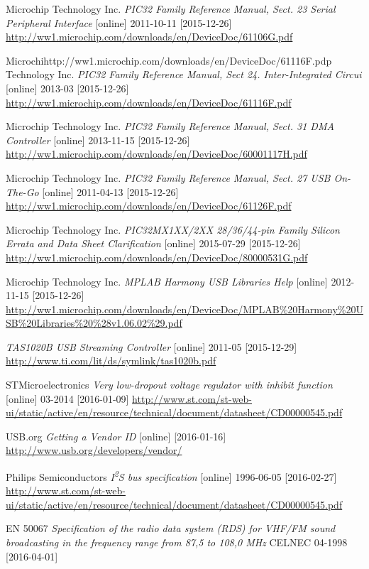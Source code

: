 \documentclass[czech,master,public,dept460,male,cpdeclaration]{diploma}	%
\newcommand{\iis}{I\textsuperscript{2}S }
\begin{document}
\begin{thebibliography}{99}
 Microchip Technology Inc.
\textit{PIC32 Family Reference Manual, Sect. 23 Serial Peripheral Interface} [online] 2011-10-11 [2015-12-26]
\url{http://ww1.microchip.com/downloads/en/DeviceDoc/61106G.pdf}

 Microchihttp://ww1.microchip.com/downloads/en/DeviceDoc/61116F.pdp Technology Inc.
\textit{PIC32 Family Reference Manual,  Sect 24. Inter-Integrated Circui} [online] 2013-03 [2015-12-26]
\url{http://ww1.microchip.com/downloads/en/DeviceDoc/61116F.pdf}

 Microchip Technology Inc.
\textit{PIC32 Family Reference Manual, Sect. 31 DMA Controller} [online] 2013-11-15 [2015-12-26]
\url{http://ww1.microchip.com/downloads/en/DeviceDoc/60001117H.pdf}

 Microchip Technology Inc.
\textit{PIC32 Family Reference Manual, Sect. 27 USB On-The-Go} [online] 2011-04-13 [2015-12-26]
\url{http://ww1.microchip.com/downloads/en/DeviceDoc/61126F.pdf}

 Microchip Technology Inc.
\textit{PIC32MX1XX/2XX 28/36/44-pin Family Silicon Errata and Data Sheet Clarification} [online] 2015-07-29 [2015-12-26]
\url{http://ww1.microchip.com/downloads/en/DeviceDoc/80000531G.pdf}

 Microchip Technology Inc.
\textit{MPLAB Harmony USB Libraries Help} [online] 2012-11-15 [2015-12-26]
\url{http://ww1.microchip.com/downloads/en/DeviceDoc/MPLAB\%20Harmony\%20USB\%20Libraries\%20\%28v1.06.02\%29.pdf}

\textit{TAS1020B USB Streaming Controller} [online] 2011-05 [2015-12-29]
\url{http://www.ti.com/lit/ds/symlink/tas1020b.pdf} 

 STMicroelectronics
\textit{Very low-dropout voltage regulator with inhibit function} [online] 03-2014 [2016-01-09]
\url{http://www.st.com/st-web-ui/static/active/en/resource/technical/document/datasheet/CD00000545.pdf}

 USB.org
\textit{Getting a Vendor ID} [online] [2016-01-16]
\url{http://www.usb.org/developers/vendor/}

 Philips Semiconductors
\textit{\iis bus specification} [online] 1996-06-05 [2016-02-27]
\url{http://www.st.com/st-web-ui/static/active/en/resource/technical/document/datasheet/CD00000545.pdf}

 EN 50067
\textit{Specification of the radio data system (RDS) for VHF/FM sound broadcasting in the frequency range from 87,5 to 108,0 MHz} CELNEC 04-1998 [2016-04-01]


\end{thebibliography}
\end{document}
